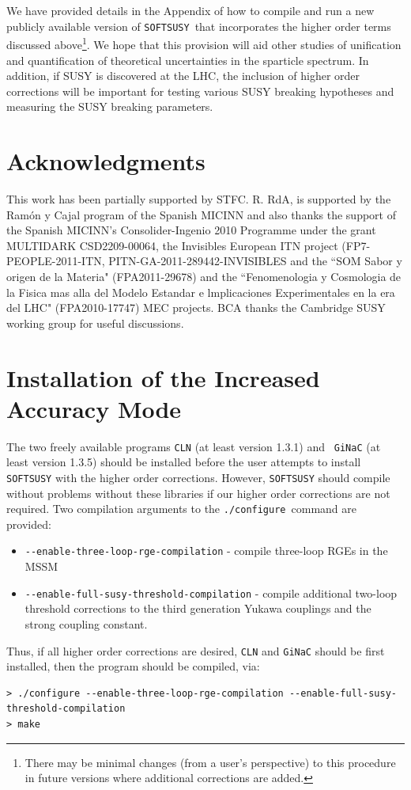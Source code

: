 \documentclass[final,3p,times,pdflatex]{elsarticle}
\begin{document}
 We have provided details in the Appendix of how to compile and run a new
 publicly available version of {\tt    SOFTSUSY}~that incorporates the higher
 order terms discussed above\footnote{There may be minimal changes (from a
   user's 
 perspective) to this procedure in future versions where additional
 corrections are added.}. We hope that this provision will aid other studies of
 unification and quantification of theoretical uncertainties in the sparticle
 spectrum. In addition, if SUSY is discovered at the LHC, the inclusion of 
 higher order corrections will be important for testing various SUSY breaking
 hypotheses and measuring the SUSY breaking parameters. 

\section*{Acknowledgments}
This work has been partially supported by STFC. R. RdA, is supported by the
Ram\'on y Cajal program of the Spanish MICINN and also thanks the support of
the Spanish MICINN's Consolider-Ingenio 2010 Programme under the grant
MULTIDARK CSD2209-00064, the Invisibles European ITN project
(FP7-PEOPLE-2011-ITN, PITN-GA-2011-289442-INVISIBLES and the ``SOM Sabor y
origen de la Materia" (FPA2011-29678) and the ``Fenomenologia y Cosmologia de
la Fisica mas alla del Modelo Estandar e lmplicaciones Experimentales en la
era del LHC" (FPA2010-17747) MEC projects. BCA thanks the Cambridge SUSY
working group for useful discussions. 

\appendix

\section{Installation of the Increased Accuracy Mode}
\label{sec:install}

The two freely available programs {\tt CLN} (at least version 1.3.1) and {\tt
  GiNaC} (at least version 1.3.5) should be installed before the user attempts
to install {\tt SOFTSUSY} with the higher order corrections. However, 
{\tt SOFTSUSY} should compile without problems without these libraries if our
higher order 
corrections are not required. 
Two compilation arguments to the {\tt ./configure}~command are provided:
\begin{itemize}
	\item[] \verb|--enable-three-loop-rge-compilation| - compile three-loop RGEs in the MSSM 
	\item[] \verb|--enable-full-susy-threshold-compilation| - compile
          additional two-loop threshold corrections to the third generation
          Yukawa couplings and the strong coupling constant.
\end{itemize}
Thus, if all higher order corrections are desired, {\tt CLN} and {\tt GiNaC}
should be first installed, then 
the program should be
compiled, via:
\begin{verbatim}
> ./configure --enable-three-loop-rge-compilation --enable-full-susy-threshold-compilation
> make
\end{verbatim}
\end{document}
